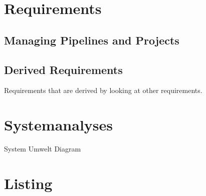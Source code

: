 \section{Requirements}

\subsection{Managing Pipelines and Projects}
\begin{itemize}
\end{itemize}

\subsection{Derived Requirements}
Requirements that are derived by looking at other requirements.

\section{Systemanalyses}
System Umwelt Diagram

\section{Listing}


\begin{itemize}
\end{itemize}




